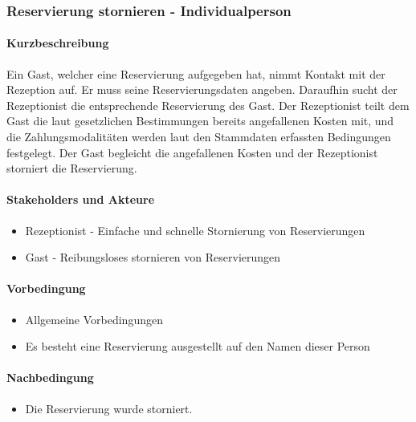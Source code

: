 \subsubsection{Reservierung stornieren - Individualperson}

\paragraph{Kurzbeschreibung}
Ein \Gls{Gast}, welcher eine \Gls{Reservierung} aufgegeben hat, nimmt Kontakt mit der \Gls{Rezeption} auf. Er muss seine Reservierungsdaten angeben. Daraufhin sucht der \Gls{Rezeptionist} die entsprechende \Gls{Reservierung} des \Gls{Gast}. Der \Gls{Rezeptionist} teilt dem \Gls{Gast} die laut gesetzlichen Bestimmungen bereits angefallenen Kosten mit, und die Zahlungsmodalitäten werden laut den Stammdaten erfassten Bedingungen festgelegt. Der \Gls{Gast} begleicht die angefallenen Kosten und der \Gls{Rezeptionist} storniert die \Gls{Reservierung}.

\paragraph{Stakeholders und Akteure}
\begin{itemize}
\item \Gls{Rezeptionist} - Einfache und schnelle Stornierung von Reservierungen
\item \Gls{Gast} - Reibungsloses stornieren von Reservierungen
\end{itemize}

\paragraph{Vorbedingung}
\begin{itemize}
\item Allgemeine Vorbedingungen
\item Es besteht eine \Gls{Reservierung} ausgestellt auf den Namen dieser Person
\end{itemize}

\paragraph{Nachbedingung}
\begin{itemize}
\item Die \Gls{Reservierung} wurde storniert.
\end{itemize}

